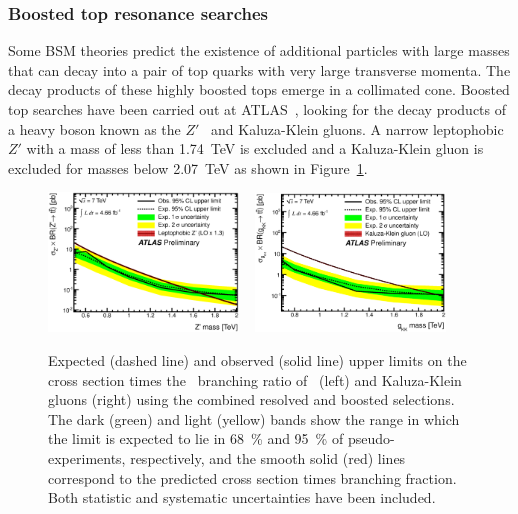 \subsubsection{Boosted top resonance searches}

Some BSM theories predict the existence of additional particles with large masses that can decay into a pair of top quarks with very large transverse momenta. The decay products of these highly boosted tops emerge in a collimated cone. Boosted top searches have been carried out at ATLAS~\cite{Boosted:ATLASExclusion7TeV}, looking for the decay products of a heavy boson known as the $Z'$~\cite{TopQuark:TC2,TopQuark:TC22} and Kaluza-Klein gluons. A narrow leptophobic $Z'$ with a mass of less than \SI{1.74}{\TeV} is excluded and a Kaluza-Klein gluon is excluded for masses below \SI{2.07}{\TeV} as shown in Figure~\ref{fig:BoostedLimits}.

\begin{figure}[htbp]
  \centering
  \includegraphics[width=0.45\textwidth]{PartTopQuark/Plots/fig_10e.eps}
  ~
  \includegraphics[width=0.45\textwidth]{PartTopQuark/Plots/fig_10f.eps}
  \caption{Expected (dashed line) and observed (solid line) upper limits on the cross section times the \ttbar\ branching ratio of \Zprime\ (left) and Kaluza-Klein gluons (right) using the combined resolved and boosted selections. The dark (green) and light (yellow) bands show the range in which the limit is expected to lie in \SI{68}{\percent} and \SI{95}{\percent} of pseudo-experiments, respectively, and the smooth solid (red) lines correspond to the predicted cross section times branching fraction. Both statistic and systematic uncertainties have been included.}
  \label{fig:BoostedLimits}
\end{figure}

